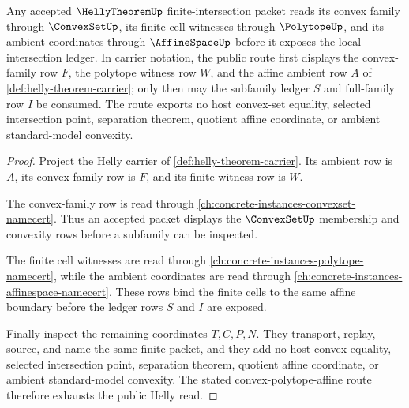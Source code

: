 \begin{theorem}
\label{thm:helly-convex-polytope-lattice-route}
Any accepted $\HellyTheoremUp$ finite-intersection packet reads its convex family through $\ConvexSetUp$, its finite cell witnesses through $\PolytopeUp$, and its ambient coordinates through $\AffineSpaceUp$ before it exposes the local intersection ledger. In carrier notation, the public route first displays the convex-family row $F$, the polytope witness row $W$, and the affine ambient row $A$ of \autoref{def:helly-theorem-carrier}; only then may the subfamily ledger $S$ and full-family row $I$ be consumed. The route exports no host convex-set equality, selected intersection point, separation theorem, quotient affine coordinate, or ambient standard-model convexity.
\end{theorem}
\begin{proof}
Project the Helly carrier of \autoref{def:helly-theorem-carrier}. Its ambient row is $A$, its convex-family row is $F$, and its finite witness row is $W$.

The convex-family row is read through \autoref{ch:concrete-instances-convexset-namecert}. Thus an accepted packet displays the $\ConvexSetUp$ membership and convexity rows before a subfamily can be inspected.

The finite cell witnesses are read through \autoref{ch:concrete-instances-polytope-namecert}, while the ambient coordinates are read through \autoref{ch:concrete-instances-affinespace-namecert}. These rows bind the finite cells to the same affine boundary before the ledger rows $S$ and $I$ are exposed.

Finally inspect the remaining coordinates $T,C,P,N$. They transport, replay, source, and name the same finite packet, and they add no host convex equality, selected intersection point, separation theorem, quotient affine coordinate, or ambient standard-model convexity. The stated convex-polytope-affine route therefore exhausts the public Helly read.
\end{proof}
